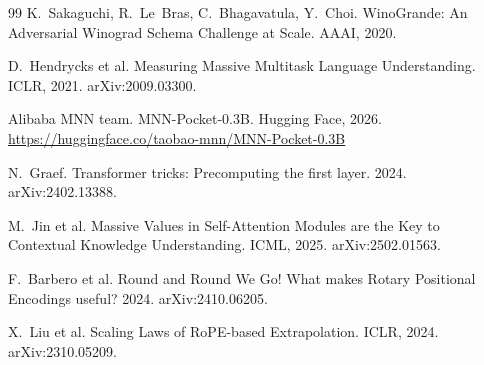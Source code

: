 \begin{thebibliography}{99}
K.~Sakaguchi, R.~Le~Bras, C.~Bhagavatula, Y.~Choi. WinoGrande: An Adversarial Winograd Schema Challenge at Scale. AAAI, 2020.

D.~Hendrycks et al. Measuring Massive Multitask Language Understanding. ICLR, 2021. arXiv:2009.03300.

Alibaba MNN team. MNN-Pocket-0.3B. Hugging Face, 2026.
\url{https://huggingface.co/taobao-mnn/MNN-Pocket-0.3B}

N.~Graef. Transformer tricks: Precomputing the first layer. 2024. arXiv:2402.13388.

M.~Jin et al. Massive Values in Self-Attention Modules are the Key to Contextual Knowledge Understanding.
ICML, 2025. arXiv:2502.01563.

F.~Barbero et al. Round and Round We Go! What makes Rotary Positional Encodings useful? 2024. arXiv:2410.06205.

X.~Liu et al. Scaling Laws of RoPE-based Extrapolation. ICLR, 2024. arXiv:2310.05209.

\end{thebibliography}
